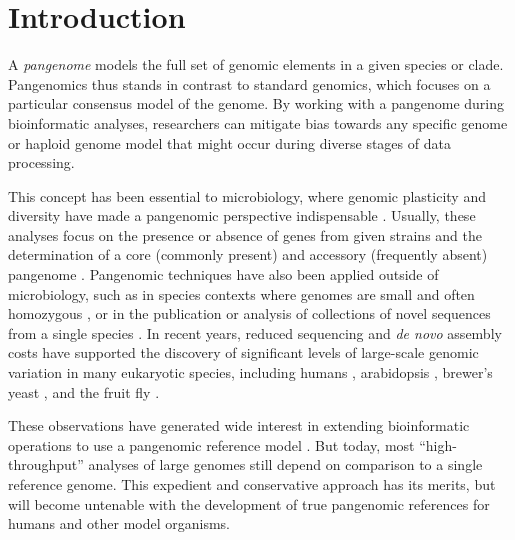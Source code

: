 \section{Introduction}

A \emph{pangenome} models the full set of genomic elements in a given species or clade.
Pangenomics thus stands in contrast to standard genomics, which focuses on a particular consensus model of the genome.
By working with a pangenome during bioinformatic analyses, researchers can mitigate bias towards any specific genome or haploid genome model that might occur during diverse stages of data processing.

This concept has been essential to microbiology, where genomic plasticity and diversity have made a pangenomic perspective indispensable \cite{Vernikos2015}.
Usually, these analyses focus on the presence or absence of genes from given strains and the determination of a core (commonly present) and accessory (frequently absent) pangenome \cite{page2015roary}.
Pangenomic techniques have also been applied outside of microbiology, such as in species contexts where genomes are small and often homozygous \cite{cao2011whole}, or in the publication or analysis of collections of novel sequences from a single species \cite{gao2019tomato,Ou_2018}.
In recent years, reduced sequencing and \emph{de novo} assembly costs have supported the discovery of significant levels of large-scale genomic variation in many eukaryotic species, including humans \cite{sudmant2015integrated,Hehir-Kwa2016-hb,chaisson2018multi,Audano_2019}, arabidopsis \cite{alonso2016arabidopsis}, brewer's yeast \cite{yue2017contrasting}, and the fruit fly \cite{chakraborty2018hidden}. %

These observations have generated wide interest in extending bioinformatic operations to use a pangenomic reference model \cite{computational2016computational}.
But today, most ``high-throughput'' analyses of large genomes still depend on comparison to a single reference genome.
This expedient and conservative approach has its merits, but will become untenable with the development of true pangenomic references for humans \cite{Church2015-vt} and other model organisms.

